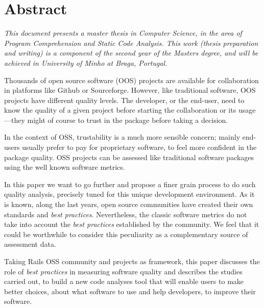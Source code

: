 \thispagestyle{plain}
\chapter*{Abstract}\label{chap:abstract}

{\it
  This document presents a master thesis in Computer Science, in the area of \textit{Program Comprehension and Static Code Analysis}.
  This work (thesis preparation and writing) is a component of the second year of the Masters degree,
  and will be achieved in University of Minho at Braga, Portugal. 

  Thousands of open source software (OOS) projects are available for collaboration in platforms like Github or Sourceforge.
  However, like traditional software, OOS projects have different quality levels.
  The developer, or the end-user, need to know the quality of a given project before starting the collaboration
  or its usage---they might of course to trust in the package before taking a decision.

  In the context of OSS, trustability is a much more sensible concern; mainly end-users usually prefer to pay for
  proprietary software, to feel more confident in the package quality.
  OSS projects can be assessed like traditional software packages using the well known software metrics.

  In this paper we want to go further and propose a finer grain process to do such quality analysis,
  precisely tuned for this unique development environment.
  As it is known, along the last years, open source communities have created their own standards and \emph{best practices}.
  Nevertheless, the classic software metrics do not take into account the \emph{best practices}
  established by the community.
  We feel that it could be worthwhile to consider this peculiarity as a complementary source of assessment data.
  
  Taking Rails OSS community and projects as framework, this paper discusses the role of
  \emph{best practices} in measuring software quality and describes the studies carried out, to build a new code analyses tool that 
  will enable users to make better choices, about what software to use and help developers, to improve their software.
}
